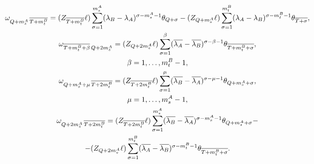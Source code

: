 \begin{gather}
\label{2s2-77}


\omega_{Q + m^A_s \, \ol{T+m^B_t}}= (Z_{\ol{T+m^B_t}} \ell)


\sum\limits_{\sigma=1}^{m^A_s} (\lambda_B-\lambda_A)^{\sigma -m^A_s-1}


\theta_{Q+\sigma} -


(Z_{Q+m^A_s} \ell) \sum\limits_{\sigma=1}^{m^B_t}


(\lambda_A-\lambda_B)^{\sigma - m^B_t - 1} \theta_{\ol{T+\sigma}},\\


%


\label{2s2-78}


\omega_{\ol{T+m^B_t+\beta} \, Q+2m^A_s}= (Z_{Q + 2m^A_s} \ell)


\sum\limits_{\sigma=1}^\beta (\ol{\lambda_A}-\ol{\lambda_B})^{\sigma


-\beta-1} \theta_{\ol{T+m^B_t+\sigma}},\\


%


\beta = 1,\dotsc,m^B_t-1,\notag \\


\label{2s2-79}


\omega_{Q + m^A_s + \mu \, \ol{T+2m^B_t}}= (Z_{\ol{T+2m^B_t}} \ell)


\sum\limits_{\sigma=1}^\mu (\ol{\lambda_B}-\ol{\lambda_A})^{\sigma


-\mu-1} \theta_{Q+m^A_s + \sigma}, \\


%


\mu = 1,\dotsc,m^A_s-1,\notag \\


%


\omega_{Q + 2m^A_s \, \ol{T+2m^B_t}}=


(Z_{\ol{T+ 2m^B_t}} \ell) \sum\limits_{\sigma=1}^{m^A_s}


(\ol{\lambda_B}-\ol{\lambda_A})^{\sigma


-m^A_s-1} \theta_{Q+m^A_s+\sigma} -\notag \\


%


\label{2s2-80}


-(Z_{Q+2m^A_s} \ell) \sum\limits_{\sigma=1}^{m^B_t}


(\ol{\lambda_A}-\ol{\lambda_B})^{\sigma


-m^B_t-1} \theta_{\ol{T+m^B_t+\sigma}}.


\end{gather}





